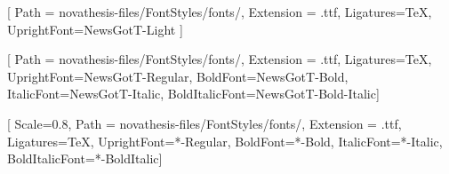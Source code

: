 \renewcommand{\rmdefault}{fbb-LF}%
\RequirePackage[scaled=.85]{beramono}%
\RequirePackage[type1]{cabin}%
\RequirePackage{amsthm}%
\RequirePackage[scr=rsfso]{mathalfa}
\RequirePackage{bm}%
\RequirePackage[no-math]{fontspec}


[
Path = novathesis-files/FontStyles/fonts/,
Extension = .ttf,
Ligatures=TeX,
UprightFont=NewsGotT-Light
]




\setmainfont{NewsGotT}[
Path = novathesis-files/FontStyles/fonts/,
Extension = .ttf,
Ligatures=TeX,
UprightFont=NewsGotT-Regular,
BoldFont=NewsGotT-Bold,
ItalicFont=NewsGotT-Italic,
BoldItalicFont=NewsGotT-Bold-Italic]

\setmonofont{Hack}[
Scale=0.8,
Path = novathesis-files/FontStyles/fonts/,
Extension = .ttf,
Ligatures=TeX,
UprightFont=*-Regular,
BoldFont=*-Bold,
ItalicFont=*-Italic,
BoldItalicFont=*-BoldItalic]

